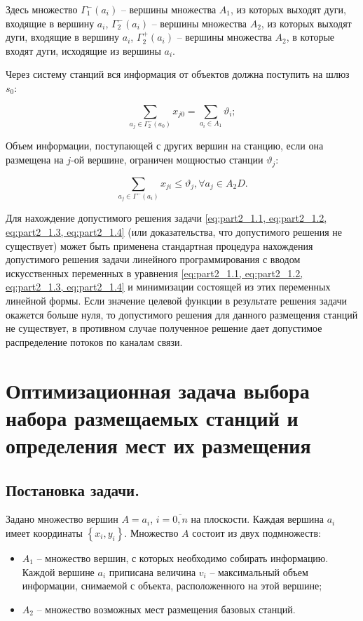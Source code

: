 Здесь множество $\Gamma_1^-(a_i)$ – вершины множества $A_1$, из которых выходят дуги, входящие в вершину $a_i$, $\Gamma_2^-(a_i)$ – вершины множества $A_2$, из которых выходят дуги, входящие в  вершину $a_i$, $\Gamma_2^+(a_i)$ – вершины множества $A_2$, в которые входят дуги, исходящие из вершины $a_i$.

Через систему станций вся информация от объектов  должна поступить  на шлюз $s_0$:

\begin{equation}\label{eq:part2_1.3}
    \sum_{a_j \in \Gamma_2^-(a_0)} x_{j0} =  \sum_{a_i \in A_1} \vartheta_i;
\end{equation}

Объем информации, поступающей с других вершин на станцию, если она размещена на $j$-ой вершине, ограничен мощностью станции $\vartheta_j$:

\begin{equation}\label{eq:part2_1.4}
    \sum_{a_j \in \Gamma^-(a_i)} x_{ji} \leqslant \vartheta_j, \forall a_j \in A_2D.
\end{equation}

Для нахождение допустимого решения задачи \cref{eq:part2_1.1, eq:part2_1.2, eq:part2_1.3, eq:part2_1.4} (или доказательства, что допустимого решения не существует) может быть применена стандартная процедура нахождения допустимого решения задачи линейного программирования с вводом искусственных переменных в уравнения \cref{eq:part2_1.1, eq:part2_1.2, eq:part2_1.3, eq:part2_1.4} и минимизации состоящей из этих переменных линейной формы. Если значение целевой функции в результате решения задачи окажется больше нуля, то допустимого решения для данного размещения станций не существует, в противном случае полученное решение дает допустимое распределение потоков по каналам связи.

\section{Оптимизационная задача выбора набора размещаемых станций и определения мест их размещения}

\subsection{Постановка задачи.}

Задано множество вершин $A = a_i$, $i=\overline{0,n}$ на плоскости. Каждая вершина $a_i$ имеет координаты $\left\{ x_i, y_i \right\}$.
Множество $A$ состоит из двух подмножеств: 
\begin{itemize}
    \item $A_1$ -- множество вершин, с которых необходимо собирать информацию. Каждой вершине $a_i$ приписана   величина $v_i$ -- максимальный объем информации, снимаемой с объекта, расположенного на этой вершине;
    \item $A_2$ -- множество возможных мест размещения базовых станций. 
\end{itemize}


